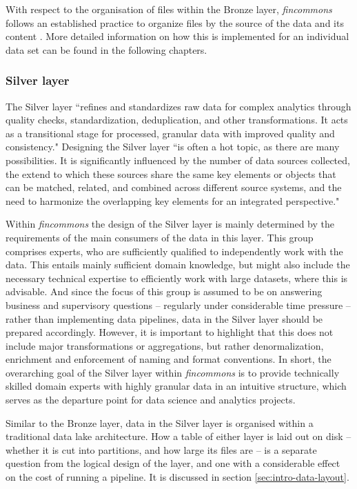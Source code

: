 \documentclass[a4paper, 11pt]{report}
\begin{document}
With respect to the organisation of files within the Bronze layer, \emph{fincommons} follows an established practice to organize files by the source of the data and its content \parencite{Gorelik.2019}. More detailed information on how this is implemented for an individual data set can be found in the following chapters.

\subsubsection{Silver layer}

The Silver layer ``refines and standardizes raw data for complex analytics through quality checks, standardization, deduplication, and other transformations. It acts as a transitional stage for processed, granular data with improved quality and consistency." \parencite[p.~5]{Strengholt.2025} Designing the Silver layer ``is often a hot topic, as there are many possibilities. It is significantly influenced by the number of data sources collected, the extend to which these sources share the same key elements or objects that can be matched, related, and combined across different source systems, and the need to harmonize the overlapping key elements for an integrated perspective." \parencite[p.~66]{Strengholt.2025}

Within \emph{fincommons} the design of the Silver layer is mainly determined by the requirements of the main consumers of the data in this layer. This group comprises experts, who are sufficiently qualified to independently work with the data. This entails mainly sufficient domain knowledge, but might also include the necessary technical expertise to efficiently work with large datasets, where this is advisable. And since the focus of this group is assumed to be on answering business and supervisory questions -- regularly under considerable time pressure -- rather than implementing data pipelines, data in the Silver layer should be prepared accordingly. However, it is important to highlight that this does not include major transformations or aggregations, but rather denormalization, enrichment and enforcement of naming and format conventions. In short, the overarching goal of the Silver layer within \emph{fincommons} is to provide technically skilled domain experts with highly granular data in an intuitive structure, which serves as the departure point for data science and analytics projects.

Similar to the Bronze layer, data in the Silver layer is organised within a traditional data lake architecture. How a table of either layer is laid out on disk -- whether it is cut into partitions, and how large its files are -- is a separate question from the logical design of the layer, and one with a considerable effect on the cost of running a pipeline. It is discussed in section \ref{sec:intro-data-layout}.
\end{document}
